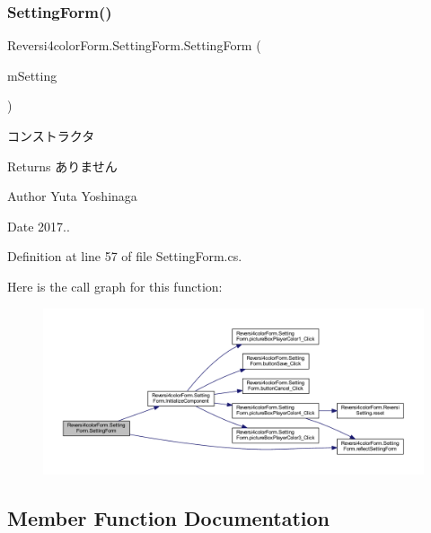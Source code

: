 \subsubsection{\texorpdfstring{Setting\+Form()}{SettingForm()}}
{\footnotesize\ttfamily Reversi4color\+Form.\+Setting\+Form.\+Setting\+Form (\begin{DoxyParamCaption}\item[{\hyperlink{class_reversi4color_form_1_1_reversi_setting}{Reversi\+Setting}}]{m\+Setting }\end{DoxyParamCaption})}



コンストラクタ 

\begin{DoxyReturn}{Returns}
ありません 
\end{DoxyReturn}
\begin{DoxyAuthor}{Author}
Yuta Yoshinaga 
\end{DoxyAuthor}
\begin{DoxyDate}{Date}
2017.. 
\end{DoxyDate}


Definition at line 57 of file Setting\+Form.\+cs.

Here is the call graph for this function\+:
\nopagebreak
\begin{figure}[H]
\begin{center}
\leavevmode
\includegraphics[width=350pt]{class_reversi4color_form_1_1_setting_form_abad707f432da3b5a135419320dbf331d_cgraph}
\end{center}
\end{figure}


\subsection{Member Function Documentation}
\mbox{\label{class_reversi4color_form_1_1_setting_form_a7e7098f2ad774fc34694fd778318a014}} 
